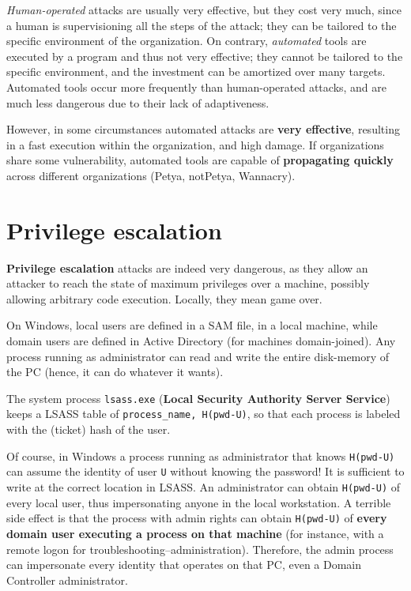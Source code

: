\documentclass[10pt]{\classname}
\begin{document}
\emph{Human\--operated} attacks are usually very effective, but they cost very
much, since a human is supervisioning all the steps of the attack; they can be
tailored to the specific environment of the organization. On contrary,
\emph{automated} tools are executed by a program and thus not very effective;
they cannot be tailored to the specific environment, and the investment can be
amortized over many targets. Automated tools occur more frequently than
human\--operated attacks, and are much less dangerous due to their lack of
adaptiveness.

However, in some circumstances automated attacks are \textbf{very effective},
resulting in a fast execution within the organization, and high damage. If
organizations share some vulnerability, automated tools are capable of
\textbf{propagating quickly} across different organizations (Petya, notPetya,
Wannacry).

\section{Privilege escalation}

\textbf{Privilege escalation} attacks are indeed very dangerous, as they allow
an attacker to reach the state of maximum privileges over a machine, possibly
allowing arbitrary code execution. Locally, they mean game over.

On Windows, local users are defined in a SAM file, in a local machine, while
domain users are defined in Active Directory (for machines domain\--joined).
Any process running as administrator can read and write the entire
disk\--memory of the PC (hence, it can do whatever it wants).

The system process \texttt{lsass.exe} (\textbf{Local Security Authority Server
Service}) keeps a LSASS table of \texttt{process\_name, H(pwd-U)}, so that each
process is labeled with the (ticket) hash of the user.

Of course, in Windows a process running as administrator that knows
\texttt{H(pwd-U)} can assume the identity of user \texttt{U} without knowing
the password! It is sufficient to write at the correct location in LSASS. An
administrator can obtain \texttt{H(pwd-U)} of every local user, thus
impersonating anyone in the local workstation. A terrible side effect is that
the process with admin rights can obtain \texttt{H(pwd-U)} of \textbf{every
domain user executing a process on that machine} (for instance, with a remote
logon for troubleshooting\---administration). Therefore, the admin process can
impersonate every identity that operates on that PC, even a Domain Controller
administrator.
\end{document}

